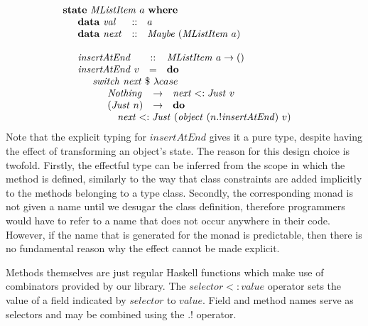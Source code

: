 \documentclass[authoryear,preprint]{sigplanconf}
\begin{document}
\begin{displaymath}
\begin{array}{l}
\mathbf{state}~\mathit{MListItem}~a~\mathbf{where} \\
\quad \begin{array}{lcl}
\mathbf{data}~\mathit{val} & :: & a \\
\mathbf{data}~\mathit{next}  & :: & \mathit{Maybe}~(\mathit{MListItem}~a)
\end{array}\\\\
\quad \begin{array}{lcl}
\mathit{insertAtEnd} & :: & \mathit{MListItem}~a \to ()\\
\mathit{insertAtEnd}~v & = & \mathbf{do} \\
\multicolumn{3}{l}{\quad \begin{array}{l}
    \mathit{switch}~\mathit{next}~\$~\lambda case \\
    \quad \begin{array}{lcl}
        \mathit{Nothing} & \to & \mathit{next} <: \mathit{Just}~v  \\
        (\mathit{Just}~n) & \to & \mathbf{do} \\
            \multicolumn{3}{l}{\quad \mathit{next} <: \mathit{Just}~(\mathit{object}~(n.!\mathit{insertAtEnd})~v) }
    \end{array}
    \end{array}}
\end{array}
\end{array}
\end{displaymath}
Note that the explicit typing for $\mathit{insertAtEnd}$ gives it a pure type, despite having the effect of transforming an object's state. The reason for this design choice is twofold. Firstly, the effectful type can be inferred from the scope in which the method is defined, similarly to the way that class constraints are added implicitly to the methods belonging to a type class. Secondly, the corresponding monad is not given a name until we desugar the class definition, therefore programmers would have to refer to a name that does not occur anywhere in their code. However, if the name that is generated for the monad is predictable, then there is no fundamental reason why the effect cannot be made explicit.

Methods themselves are just regular Haskell functions which make use of combinators provided by our library. The $\mathit{selector} <: \mathit{value}$ operator sets the value of a field indicated by $\mathit{selector}$ to $\mathit{value}$. Field and method names serve as selectors and may be combined using the $.!$ operator. 
\end{document}
